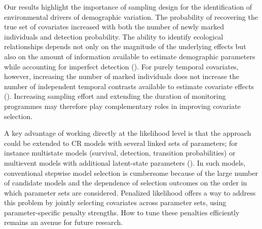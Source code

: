 \documentclass[
  11pt,
  a4paper,
]{article}
\begin{document}
Our results highlight the importance of sampling design for the identification of environmental drivers of demographic variation. The probability of recovering the true set of covariates increased with both the number of newly marked individuals and detection probability. The ability to identify ecological relationships depends not only on the magnitude of the underlying effects but also on the amount of information available to estimate demographic parameters while accounting for imperfect detection (). For purely temporal covariates, however, increasing the number of marked individuals does not increase the number of independent temporal contrasts available to estimate covariate effects (). Increasing sampling effort and extending the duration of monitoring programmes may therefore play complementary roles in improving covariate selection.

A key advantage of working directly at the likelihood level is that the approach could be extended to CR models with several linked sets of parameters; for instance multistate models (survival, detection, transition probabilities) or multievent models with additional latent-state parameters (). In such models, conventional stepwise model selection is cumbersome because of the large number of candidate models and the dependence of selection outcomes on the order in which parameter sets are considered. Penalized likelihood offers a way to address this problem by jointly selecting covariates across parameter sets, using parameter-specific penalty strengths. How to tune these penalties efficiently remains an avenue for future research.
\end{document}
